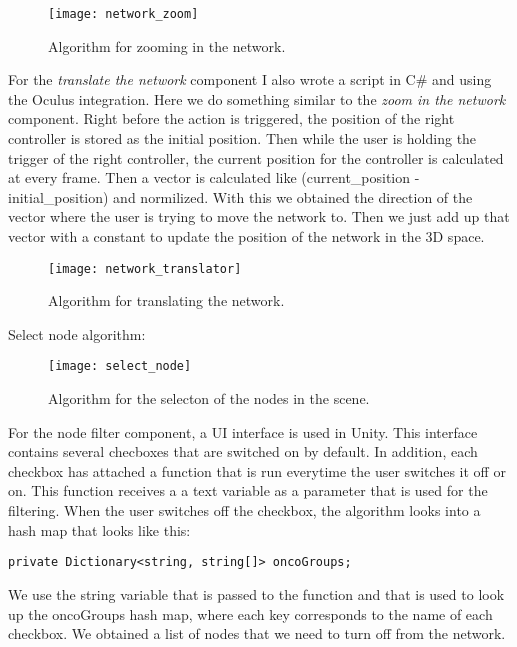 \begin{figure}[h!]
    \centering%
    \texttt{[image: network\_zoom]}
    \caption{Algorithm for zooming in the network.}
    \label{fig:network_zoom}
\end{figure}%

For the \textit{translate the network} component I also wrote a script in C\# and using the Oculus integration. Here we do something similar to the \textit{zoom in the network} component. Right before the action is triggered, the position of the right controller is stored as the initial position. Then while the user is holding the trigger of the right controller, the current position for the controller is calculated at every frame. Then a vector is calculated like (current\_position - initial\_position) and normilized. With this we obtained the direction of the vector where the user is trying to move the network to. Then we just add up that vector with a constant to update the position of the network in the 3D space.

\begin{figure}[h!]
    \centering%
    \texttt{[image: network\_translator]}
    \caption{Algorithm for translating the network.}
    \label{fig:network_translator}
\end{figure}%

Select node algorithm:
\begin{figure}[h!]
    \centering%
    \texttt{[image: select\_node]}
    \caption{Algorithm for the selecton of the nodes in the scene.}
    \label{fig:select_node}
\end{figure}%

For the node filter component, a UI interface is used in Unity. This interface contains several checboxes that are switched on by default. In addition, each checkbox has attached a function that is run everytime the user switches it off or on. This function receives a a text variable as a parameter that is used for the filtering. When the user switches off the checkbox, the algorithm looks into a hash map that looks like this:

\begin{verbatim}
private Dictionary<string, string[]> oncoGroups;
\end{verbatim}

We use the string variable that is passed to the function and that is used to look up the oncoGroups hash map, where each key corresponds to the name of each checkbox. We obtained a list of nodes that we need to turn off from the network.

